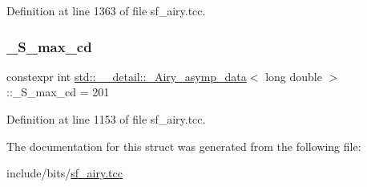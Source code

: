 Definition at line 1363 of file sf\+\_\+airy.\+tcc.

\mbox{\label{structstd_1_1____detail_1_1__Airy__asymp__data_3_01long_01double_01_4_a6a21ac69ffc53d33ebc346981bc52b9a}} 
\subsubsection{\texorpdfstring{\+\_\+\+S\+\_\+max\+\_\+cd}{\_S\_max\_cd}}
{\footnotesize\ttfamily constexpr int \hyperlink{structstd_1_1____detail_1_1__Airy__asymp__data}{std\+::\+\_\+\+\_\+detail\+::\+\_\+\+Airy\+\_\+asymp\+\_\+data}$<$ long double $>$\+::\+\_\+\+S\+\_\+max\+\_\+cd = 201\hspace{0.3cm}{\ttfamily [static]}}



Definition at line 1153 of file sf\+\_\+airy.\+tcc.



The documentation for this struct was generated from the following file\+:\begin{DoxyCompactItemize}
\item 
include/bits/\hyperlink{sf__airy_8tcc}{sf\+\_\+airy.\+tcc}\end{DoxyCompactItemize}
